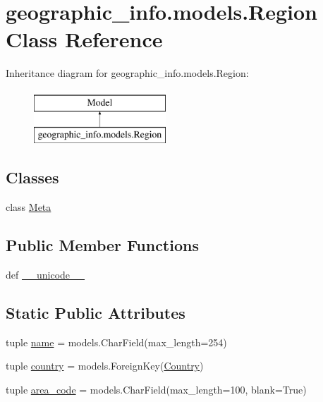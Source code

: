 \hypertarget{classgeographic__info_1_1models_1_1_region}{\section{geographic\-\_\-info.\-models.\-Region Class Reference}
\label{classgeographic__info_1_1models_1_1_region}
}
Inheritance diagram for geographic\-\_\-info.\-models.\-Region\-:\begin{figure}[H]
\begin{center}
\leavevmode
\includegraphics[height=2.000000cm]{classgeographic__info_1_1models_1_1_region}
\end{center}
\end{figure}
\subsection*{Classes}
\begin{DoxyCompactItemize}
\item 
class \hyperlink{classgeographic__info_1_1models_1_1_region_1_1_meta}{Meta}
\end{DoxyCompactItemize}
\subsection*{Public Member Functions}
\begin{DoxyCompactItemize}
\item 
def \hyperlink{classgeographic__info_1_1models_1_1_region_a6b821bf4f52bb983b2d2a5c00fcf9e6e}{\-\_\-\-\_\-unicode\-\_\-\-\_\-}
\end{DoxyCompactItemize}
\subsection*{Static Public Attributes}
\begin{DoxyCompactItemize}
\item 
tuple \hyperlink{classgeographic__info_1_1models_1_1_region_a5dc5da2f74af6b51c99842bdbeb7315d}{name} = models.\-Char\-Field(max\-\_\-length=254)
\item 
tuple \hyperlink{classgeographic__info_1_1models_1_1_region_a9d82e4d13b0fe7f0efeec8ba374569c9}{country} = models.\-Foreign\-Key(\hyperlink{classgeographic__info_1_1models_1_1_country}{Country})
\item 
tuple \hyperlink{classgeographic__info_1_1models_1_1_region_aa23284811d00b9d83b47d2393fff16a4}{area\-\_\-code} = models.\-Char\-Field(max\-\_\-length=100, blank=True)
\end{DoxyCompactItemize}


